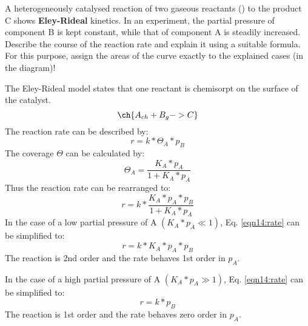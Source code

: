 \begin{question}
A heterogeneously catalysed reaction of two gaseous reactants () to the product C shows \textbf{Eley-Rideal} kinetics. In an experiment, the partial pressure of component B is kept constant, while that of component A is steadily increased. Describe the course of the reaction rate and explain it using a suitable formula.  For this purpose, assign the areas of the curve exactly to the explained cases (in the diagram)! 

\end{question}
\begin{solution}
The Eley-Rideal model states that one reactant is chemisorpt on the surface of the catalyst.
\begin{equation*}
\ch{A_{ch} + B_{g} -> C}
\end{equation*}
The reaction rate can be described by:
\begin{equation}
r = k * \Theta_A * p_B
\end{equation}
The coverage $\Theta$ can be calculated by:
\begin{equation}
\Theta_A = \frac{K_A * p_A}{1 + K_A * p_A}
\end{equation}
Thus the reaction rate can be rearranged to:
\begin{equation}\label{eqn14:rate}
r = k * \frac{K_A * p_A * p_B}{1 + K_A * p_A}
\end{equation}
In the case of a low partial pressure of A $(K_A * p_A \ll 1)$, Eq. \ref{eqn14:rate} can be simplified to:
\begin{equation}
r = k * K_A *  p_A * p_B
\end{equation}
The reaction is 2nd order and the rate behaves 1st order in $p_A$. 

In the case of a high partial pressure of A $(K_A * p_A \gg 1)$, Eq. \ref{eqn14:rate} can be simplified to:
\begin{equation}
r = k * p_B 
\end{equation}
The reaction is 1st order and the rate behaves zero order in $p_A$. 
\begin{center}

\end{center}
\end{solution}
